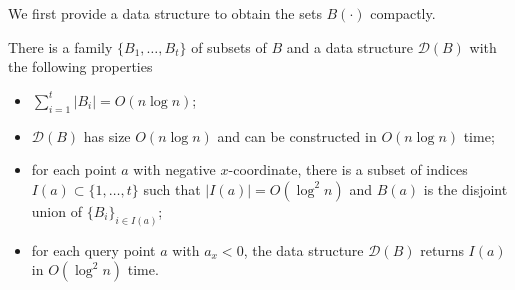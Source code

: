 \documentclass[a4paper,USenglish,numberwithinsect]{lipics}
\newcommand{\D}{\ensuremath{\mathcal{D}}}
\begin{document}
We first provide a data structure to obtain the sets $B(\cdot)$ compactly.
\begin{lemma}
\label{le:range}
	There is a family $\{ B_1,\dots, B_t\}$ of subsets of $B$
	and a data structure $\D (B)$ with the following properties
	\begin{itemize}
		\item $\sum_{i=1}^t |B_i| = O(n\log n)$;
		\item $\D (B)$ has size $O(n\log n)$ and can be constructed
			in $O(n\log n)$ time;
		\item for each point $a$ with negative $x$-coordinate, 
			there is a subset of indices 
			$I(a)\subset \{ 1,\dots,t\}$ such that $|I(a)|=O(\log^2 n)$ and
			$B(a)$ is the disjoint union of $\{ B_i \}_{i\in I(a)}$;
		\item for each query point $a$ with $a_x<0$, the data structure  $\D (B)$ returns $I(a)$
			in $O(\log^2 n)$ time.
	\end{itemize}
\end{lemma}
\end{document}
